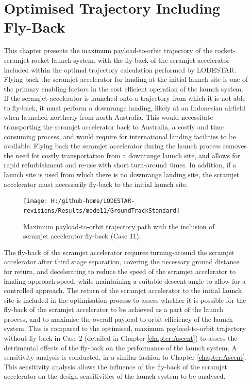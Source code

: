 
\cleardoublepage
\chapter{Optimised Trajectory Including Fly-Back}\label{chapter:Flyback}
	
This chapter presents the maximum payload-to-orbit trajectory of the rocket-scramjet-rocket launch system, with the fly-back of the scramjet accelerator included within the optimal trajectory calculation performed by LODESTAR. 
Flying back the scramjet accelerator for landing at the initial launch site is one of the primary enabling factors in the cost efficient operation of the launch system. If the scramjet accelerator is launched onto a trajectory from which it is not able to fly-back, it must perform a downrange landing, likely at an Indonesian airfield when launched northerly from north Australia. This would necessitate transporting the scramjet accelerator back to Australia, a costly and time consuming process, and would require for international landing facilities to be available. 
Flying back the scramjet accelerator during the launch process removes the need for costly transportation from a downrange launch site, and allows for rapid refurbishment and re-use with short turn-around times.
In addition, if a launch site is used from which there is no downrange landing site, the scramjet accelerator must necessarily fly-back to the initial launch site. 


\begin{figure}[ht]%
	\centering
	\texttt{[image: H:/github-home/LODESTAR-revisions/Results/mode11/GroundTrackStandard]}
	\caption{Maximum payload-to-orbit trajectory path with the inclusion of scramjet accelerator fly-back (Case 11). } %
	\label{fig:GroundTrackStandard}
\end{figure}

The fly-back of the scramjet accelerator requires turning-around the scramjet accelerator after third stage separation, covering the necessary ground distance for return, and decelerating to reduce the speed of the scramjet accelerator to landing approach speed, while maintaining a suitable descent angle to allow for a controlled approach. 
The return of the scramjet accelerator to the initial launch site is included in the optimisation process to assess whether it is possible for the fly-back of the scramjet accelerator to be achieved as a part of the launch process, and to maximise the overall payload-to-orbit efficiency of the launch system. This is compared to the optimised, maximum payload-to-orbit trajectory without fly-back in Case 2 (detailed in Chapter \ref{chapter:Ascent}) to assess the detrimental effects of the fly-back on the performance of the launch system. 
A sensitivity analysis is conducted, in a similar fashion to Chapter \ref{chapter:Ascent}. 
This sensitivity analysis allows the influence of the fly-back of the scramjet accelerator on the design sensitivities of the launch system to be analysed.


